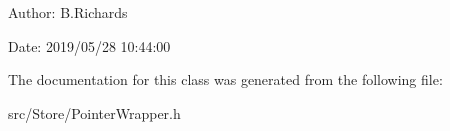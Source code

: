 \begin{DoxyParagraph}{Author\-:}
B.\-Richards 
\end{DoxyParagraph}
\begin{DoxyParagraph}{Date\-:}
2019/05/28 10\-:44\-:00 
\end{DoxyParagraph}


The documentation for this class was generated from the following file\-:\begin{DoxyCompactItemize}
\item 
src/\-Store/Pointer\-Wrapper.\-h\end{DoxyCompactItemize}
